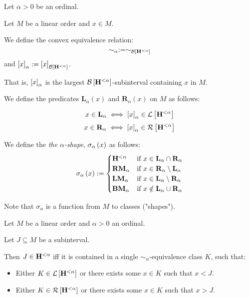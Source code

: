 \begin{definition}
  Let $\alpha > 0$ be an ordinal.

  Let $M$ be a linear order and $x \in M$.

  We define the convex equivalence relation:
  \[\sim_\alpha := \sim_{\mathcal{B} \left[ {\mathbf{H}^{< \alpha}} \right]}\]
  and $\left[ {x} \right]_{\alpha} := \left[ {x} \right]_{\mathcal{B} \left[ {\mathbf{H}^{< \alpha}} \right]}$.

  That is,
  $\left[ {x} \right]_{\alpha}$ is the largest $\mathcal{B} \left[ {\mathbf{H}^{< \alpha}} \right]$-subinterval
  containing $x$ in $M$.

  We define the predicates $\mathbf{L}_{\alpha}(x)$ and $\mathbf{R}_{\alpha}(x)$ on $M$ as follows:

  \[
    x \in \mathbf{L}_{\alpha} \iff \left[ {x} \right]_{\alpha} \in \mathcal{L} \left[ {\mathbf{H}^{< \alpha}} \right]
  \]
  \[
    x \in \mathbf{R}_{\alpha} \iff \left[ {x} \right]_{\alpha} \in \mathcal{R} \left[ {\mathbf{H}^{< \alpha}} \right]
  \]

  We define the \emph{the $\alpha$-shape}, $\sigma_{\alpha} \left( {x} \right)$ as follows:
  \[
    \sigma_{\alpha} \left( {x} \right) := \begin{cases}
      \mathbf{H}^{< \alpha} & \text{if } x \in \mathbf{L}_{\alpha} \cap \mathbf{R}_{\alpha}      \\
      \mathbf{RM}_{\alpha}  & \text{if } x \in \mathbf{R}_{\alpha} \setminus \mathbf{L}_{\alpha} \\
      \mathbf{LM}_{\alpha}  & \text{if } x \in \mathbf{L}_{\alpha} \setminus \mathbf{R}_{\alpha} \\
      \mathbf{BM}_{\alpha}  & \text{if } x \notin \mathbf{L}_{\alpha} \cup \mathbf{R}_{\alpha}
    \end{cases}
  \]

  Note that $\sigma_{\alpha}$ is a function from $M$ to classes ("shapes").
\end{definition}

\begin{lemma}\label{alpha-expressible}
  Let $M$ be a linear order and $\alpha > 0$ an ordinal.

  Let $J \subseteq M$ be a subinterval.

  Then $J \in \mathbf{H}^{< \alpha}$ iff
  it is contained in a single $\sim_{\alpha}$-equivalence class $K$, such that:
  \begin{itemize}
    \item Either $K \in \mathcal{L} \left[ {\mathbf{H}^{< \alpha}} \right]$ or
          there exists some $x \in K$ such that $x < J$.
    \item Either $K \in \mathcal{R} \left[ {\mathbf{H}^{< \alpha}} \right]$ or
          there exists some $x \in K$ such that $x > J$.
  \end{itemize}
\end{lemma}


